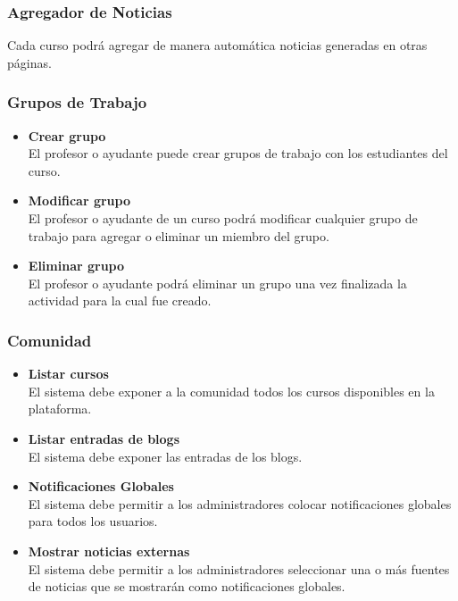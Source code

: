 \subsubsection{Agregador de Noticias}
Cada curso podrá agregar de manera automática noticias generadas en otras páginas.

\subsubsection{Grupos de Trabajo}
\begin{itemize}
	\item \textbf{Crear grupo}\\
	El profesor o ayudante puede crear grupos de trabajo con los estudiantes del curso.
	\item \textbf{Modificar grupo}\\
	El profesor o ayudante de un curso podrá modificar cualquier grupo de trabajo para agregar o eliminar un miembro del grupo.
	\item \textbf{Eliminar grupo}\\
	El profesor o ayudante podrá eliminar un grupo una vez finalizada la actividad para la cual fue creado.
\end{itemize}

\subsubsection{Comunidad}
\begin{itemize}
	\item \textbf{Listar cursos}\\
	El sistema debe exponer a la comunidad todos los cursos disponibles en la plataforma.
	\item \textbf{Listar entradas de blogs}\\
	El sistema debe exponer las entradas de los blogs.
	\item \textbf{Notificaciones Globales}\\
	El sistema debe permitir a los administradores colocar notificaciones globales para todos los usuarios.
	\item \textbf{Mostrar noticias externas}\\
	El sistema debe permitir a los administradores seleccionar una o más fuentes de noticias que se mostrarán como notificaciones globales.
\end{itemize}

